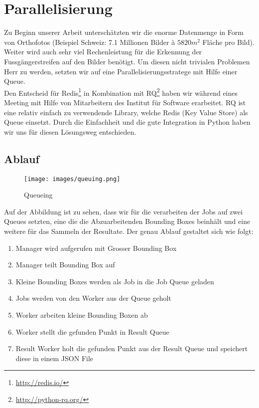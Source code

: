 \section{Parallelisierung}
Zu Beginn unserer Arbeit unterschätzten wir die enorme Datenmenge in Form von Orthofotos (Beispiel Schweiz: 7.1 Millionen Bilder à $5820 m^{2}$ Fläche pro Bild). Weiter wird auch sehr viel Rechenleistung für die Erkennung der Fussgängerstreifen auf den Bilder benötigt. Um diesen nicht trivialen Problemen Herr zu werden, setzten wir auf eine Parallelisierungsstratege mit Hilfe einer Queue. \\ 

Den Entscheid für Redis\footnote{\url{http://redis.io/}} in Kombination mit RQ\footnote{\url{http://python-rq.org/}} haben wir während eines Meeting mit Hilfe von Mitarbeitern des Institut für Software erarbeitet. RQ ist eine relativ einfach zu verwendende Library, welche Redis (Key Value Store) als Queue einsetzt. Durch die Einfachheit und die gute Integration in Python haben wir uns für diesen Lösungsweg entschieden.

\newpage
\subsection{Ablauf}
\label{subsec:ablauf}
\begin{figure}[H]
\texttt{[image: images/queuing.png]}
\caption[Queueing]{Queueing}
\end{figure}
Auf der Abbildung ist zu sehen, dass wir für die verarbeiten der Jobs auf zwei Queues setzten, eine die die Abzuarbeitenden Bounding Boxes beinhält und eine weitere für das Sammeln der Resultate. Der genau Ablauf gestaltet sich wie folgt:
\begin{enumerate}
		\item Manager wird aufgerufen mit Grosser Bounding Box
		\item Manager teilt Bounding Box auf
		\item Kleine Bounding Boxes werden als Job in die Job Queue geladen
		\item Jobs werden von den Worker aus der Queue geholt
		\item Worker arbeiten kleine Bounding Boxen ab
		\item Worker stellt die gefunden Punkt in Result Queue
		\item Result Worker holt die gefunden Punkt aus der Result Queue und speichert diese in einem JSON File 
\end{enumerate}










